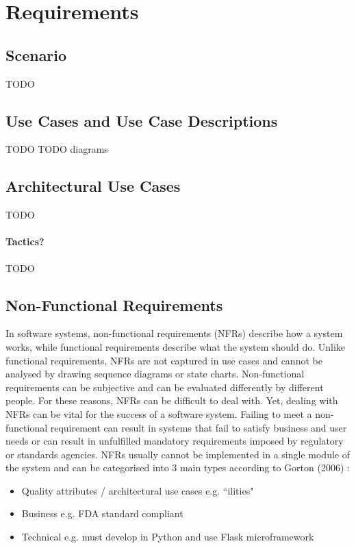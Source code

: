 \chapter{Requirements}


\section{Scenario}
TODO

\section{Use Cases and Use Case Descriptions}
TODO
TODO diagrams

\section{Architectural Use Cases}
TODO

\subsubsection{Tactics?}
TODO


\section{Non-Functional Requirements}

In software systems, non-functional requirements (NFRs) describe how a system works, while functional requirements describe what the system should do. Unlike functional requirements, NFRs are not captured in use cases and cannot be analysed by drawing sequence diagrams or state charts. Non-functional requirements can be subjective and can be evaluated differently by different people. For these reasons, NFRs can be difficult to deal with. Yet, dealing with NFRs can be vital for the success of a software system. \cite{nfrs} Failing to meet a non-functional requirement can result in systems that fail to satisfy business and user needs or can result in unfulfilled mandatory requirements imposed by regulatory or standards agencies. NFRs usually cannot be implemented in a single module of the system and can be categorised into 3 main types according to Gorton (2006) \cite{sw-arch}:
\begin{itemize}
  \item Quality attributes / architectural use cases e.g. ``ilities"
  \item Business e.g. FDA standard compliant
  \item Technical e.g. must develop in Python and use Flask microframework
\end{itemize}

